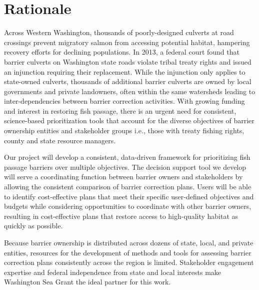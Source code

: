 \documentclass[12pt]{elsarticle}
\begin{document}
		\section{Rationale}
			Across Western Washington, thousands of poorly-designed culverts at road crossings prevent migratory salmon from accessing potential habitat, hampering recovery efforts for declining populations. In 2013, a federal court found that barrier culverts on Washington state roads violate tribal treaty rights and issued an injunction requiring their replacement. While the injunction only applies to state-owned culverts, thousands of additional barrier culverts are owned by local governments and private landowners, often within the same watersheds leading to inter-dependencies between barrier correction activities. With growing funding and interest in restoring fish passage, there is an urgent need for consistent, science-based prioritization tools that account for the diverse objectives of barrier ownership entities and stakeholder groups i.e., those with treaty fishing rights, county and state resource managers.
			
			Our project will develop a consistent, data-driven framework for prioritizing fish passage barriers over multiple objectives. The decision support tool we develop will serve a coordinating function between barrier owners and stakeholders by allowing the consistent comparison of barrier correction plans. Users will be able to identify cost-effective plans that meet their specific user-defined objectives and budgets while considering opportunities to coordinate with other barrier owners, resulting in cost-effective plans that restore access to high-quality habitat as quickly as possible.
			
			Because barrier ownership is distributed across dozens of state, local, and private entities, resources for the development of methods and tools for assessing barrier correction plans consistently across the region is limited. Stakeholder engagement expertise and federal independence from state and local interests make Washington Sea Grant the ideal partner for this work.
			
			
			
\end{document}
